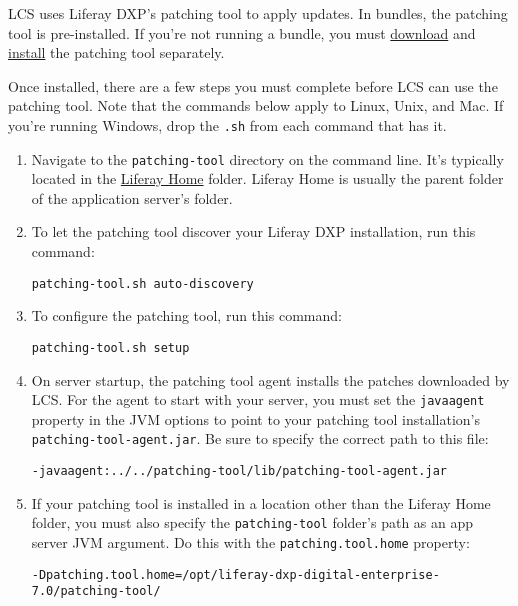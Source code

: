LCS uses Liferay DXP's patching tool to apply updates. In bundles, the
patching tool is pre-installed. If you're not running a bundle, you must
\href{https://web.liferay.com/group/customer/dxp/downloads/digital-enterprise/patching-tool}{download}
and \href{/docs/7-0/deploy/-/knowledge_base/d/patching-liferay}{install}
the patching tool separately.

Once installed, there are a few steps you must complete before LCS can
use the patching tool. Note that the commands below apply to Linux,
Unix, and Mac. If you're running Windows, drop the \texttt{.sh} from
each command that has it.

\begin{enumerate}
\def\labelenumi{\arabic{enumi}.}
\item
  Navigate to the \texttt{patching-tool} directory on the command line.
  It's typically located in the
  \href{/docs/7-0/deploy/-/knowledge_base/d/installing-product\#liferay-home}{Liferay
  Home} folder. Liferay Home is usually the parent folder of the
  application server's folder.
\item
  To let the patching tool discover your Liferay DXP installation, run
  this command:

\begin{verbatim}
patching-tool.sh auto-discovery
\end{verbatim}
\item
  To configure the patching tool, run this command:

\begin{verbatim}
patching-tool.sh setup
\end{verbatim}
\item
  On server startup, the patching tool agent installs the patches
  downloaded by LCS. For the agent to start with your server, you must
  set the \texttt{javaagent} property in the JVM options to point to
  your patching tool installation's \texttt{patching-tool-agent.jar}. Be
  sure to specify the correct path to this file:

\begin{verbatim}
-javaagent:../../patching-tool/lib/patching-tool-agent.jar
\end{verbatim}
\item
  If your patching tool is installed in a location other than the
  Liferay Home folder, you must also specify the \texttt{patching-tool}
  folder's path as an app server JVM argument. Do this with the
  \texttt{patching.tool.home} property:

\begin{verbatim}
-Dpatching.tool.home=/opt/liferay-dxp-digital-enterprise-7.0/patching-tool/
\end{verbatim}
\end{enumerate}

